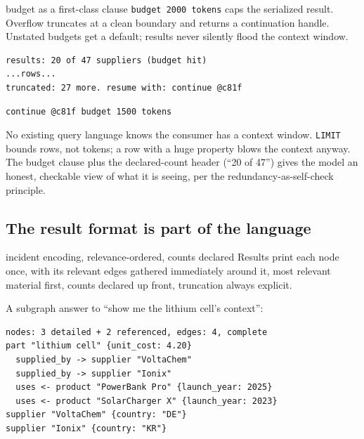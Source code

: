 \documentclass[11pt]{article}
\begin{document}
\begin{featurebox}{budget as a first-class clause}
\texttt{budget 2000 tokens} caps the serialized result. Overflow truncates at a clean boundary and returns a continuation handle. Unstated budgets get a default; results never silently flood the context window.
\end{featurebox}

\begin{lstlisting}[style=result]
results: 20 of 47 suppliers (budget hit)
...rows...
truncated: 27 more. resume with: continue @c81f
\end{lstlisting}

\begin{lstlisting}[style=new]
continue @c81f budget 1500 tokens
\end{lstlisting}

No existing query language knows the consumer has a context window. \texttt{LIMIT} bounds rows, not tokens; a row with a huge property blows the context anyway. The budget clause plus the declared-count header (``20 of 47'') gives the model an honest, checkable view of what it is seeing, per the redundancy-as-self-check principle.

\subsection{The result format is part of the language}

\begin{featurebox}{incident encoding, relevance-ordered, counts declared}
Results print each node once, with its relevant edges gathered immediately around it, most relevant material first, counts declared up front, truncation always explicit.
\end{featurebox}

A subgraph answer to ``show me the lithium cell's context'':

\begin{lstlisting}[style=result]
nodes: 3 detailed + 2 referenced, edges: 4, complete
part "lithium cell" {unit_cost: 4.20}
  supplied_by -> supplier "VoltaChem"
  supplied_by -> supplier "Ionix"
  uses <- product "PowerBank Pro" {launch_year: 2025}
  uses <- product "SolarCharger X" {launch_year: 2023}
supplier "VoltaChem" {country: "DE"}
supplier "Ionix" {country: "KR"}
\end{lstlisting}
\end{document}
